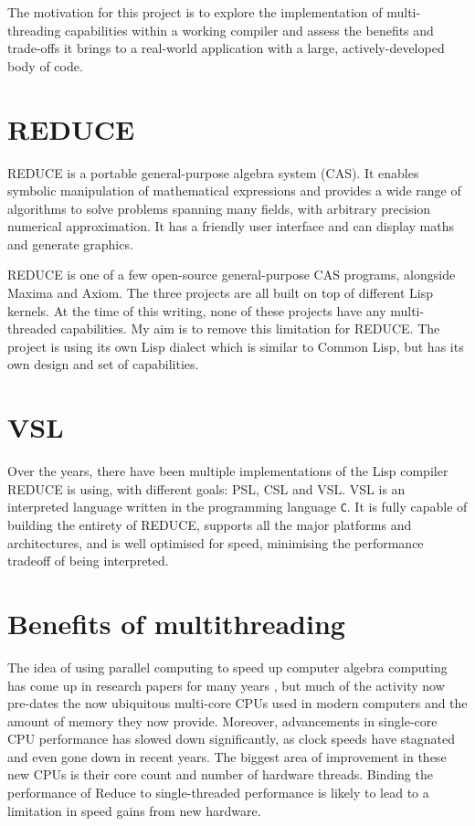 The motivation for this project is to explore the implementation of multi-threading
capabilities within a working compiler and assess the benefits and trade-offs it brings
to a real-world application with a large, actively-developed body of code.

\section{REDUCE}

REDUCE \cite{reduce} is a portable general-purpose algebra system (CAS). It enables symbolic
manipulation of mathematical expressions and provides a wide range of algorithms
to solve problems spanning many fields, with arbitrary precision numerical approximation.
It has a friendly user interface and can display maths and generate graphics.

REDUCE is one of a few open-source general-purpose CAS programs, alongside Maxima and Axiom.
The three projects are all built on top of different Lisp kernels. At the time of this writing,
none of these projects have any multi-threaded capabilities. My aim is to remove this limitation
for REDUCE. The project is using its own Lisp dialect which is similar to Common Lisp, but has its
own design and set of capabilities.

\section{VSL}

Over the years, there have been multiple implementations of the Lisp compiler REDUCE is using, with
different goals: PSL, CSL and VSL. VSL is an interpreted language written in the programming
language \texttt{C}. It is fully capable of building the entirety of REDUCE, supports all the major
platforms and architectures, and is well optimised for speed, minimising the performance tradeoff
of being interpreted.

\section{Benefits of multithreading}
The idea of using parallel computing to speed up computer algebra computing has come
up in research papers for many years \cite{GabrielQML,multilisp,multilisp-implementation},
but much of the activity now
pre-dates the now ubiquitous multi-core CPUs used in modern computers and the amount of memory
they now provide. Moreover, advancements in single-core CPU performance has slowed down
significantly, as clock speeds have stagnated and even gone down in recent years. The biggest
area of improvement in these new CPUs is their core count and number of hardware threads.
Binding the performance of Reduce to single-threaded performance is likely to lead to
a limitation in speed gains from new hardware.

